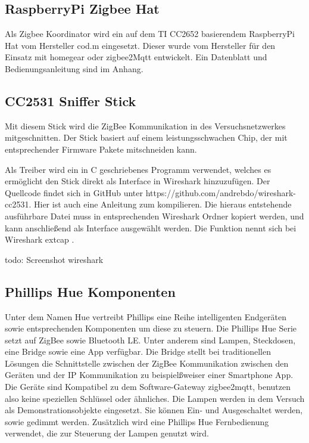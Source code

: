 \subsection{RaspberryPi Zigbee Hat}

Als Zigbee Koordinator wird ein auf dem TI CC2652 basierendem RaspberryPi Hat vom Hersteller \grqq cod.m \grqq{} eingesetzt. Dieser wurde vom Hersteller
für den Einsatz mit \grqq homegear \grqq{} oder \grqq zigbee2Mqtt \grqq{} entwickelt. Ein Datenblatt und Bedienungsanleitung sind im Anhang.

\subsection{CC2531 Sniffer Stick}

Mit diesem Stick wird die ZigBee Kommunikation in des Versuchsnetzwerkes mitgeschnitten.
Der Stick basiert auf einem leistungsschwachen Chip, der mit entsprechender Firmware Pakete mitschneiden kann. 

Als Treiber wird ein in C geschriebenes Programm verwendet, welches es ermöglicht den Stick direkt als Interface in Wireshark hinzuzufügen. Der Quellcode findet sich in 
GitHub unter https://github.com/andrebdo/wireshark-cc2531. Hier ist auch eine Anleitung zum kompilieren. Die hieraus entstehende ausführbare Datei muss in entsprechenden
Wireshark Ordner kopiert werden, und kann anschließend als Interface ausgewählt werden. Die Funktion nennt sich bei Wireshark \grqq extcap \grqq{}.

todo: Screenshot wireshark

\subsection{Phillips Hue Komponenten}

Unter dem Namen \grqq Hue \grqq{} vertreibt Phillips eine Reihe intelligenten Endgeräten sowie entsprechenden Komponenten um diese zu steuern.
Die Phillips Hue Serie setzt auf ZigBee sowie Bluetooth LE. Unter anderem sind Lampen, Steckdosen, eine Bridge sowie eine App verfügbar.
Die Bridge stellt bei traditionellen Lösungen die Schnittstelle zwischen der ZigBee Kommunikation zwischen den Geräten und der IP Kommunikation zu beispielßweiser einer Smartphone
App.  Die Geräte sind Kompatibel zu dem Software-Gateway zigbee2mqtt, benutzen also keine speziellen Schlüssel oder ähnliches.
Die Lampen werden in dem Versuch als Demonstrationsobjekte eingesetzt. Sie können Ein- und Ausgeschaltet werden, sowie gedimmt werden. Zusätzlich wird eine
Phillips Hue Fernbedienung verwendet, die zur Steuerung der Lampen genutzt wird.

